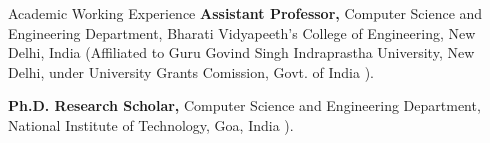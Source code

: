 \begin{rubric}{Academic Working Experience}
	\entry*[2012 -- Present]%
		\textbf{Assistant Professor,} Computer Science and Engineering Department, Bharati Vidyapeeth's College of Engineering, New Delhi, India (Affiliated to Guru Govind Singh Indraprastha University, New Delhi, under University Grants Comission, Govt. of India ).

	\entry*[2021 -- Present]%
		\textbf{Ph.D. Research Scholar,} Computer Science and Engineering Department, National Institute of Technology, Goa, India ).
	
	\end{rubric}